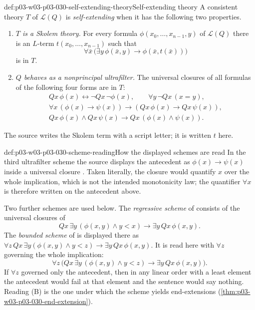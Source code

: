 \begin{hbdefinition}{def:p03-w03-p03-030-self-extending-theory}{Self-extending theory}
A consistent theory \(T\) of \(\mathscr L(Q)\) is \emph{self-extending}
\cite[Definition~6.1.1, pp.~202--203]{Schmerl1985TransferTheorems} when it
has the following two properties.
\begin{enumerate}
\item \emph{\(T\) is a Skolem theory.}  For every formula
  \(\phi(x_0,\ldots,x_{n-1},y)\) of \(\mathscr L(Q)\) there is an
  \(L\)-term \(t(x_0,\ldots,x_{n-1})\) such that
  \[
   \forall\bar x\,\bigl(\exists y\,\phi(\bar x,y)\rightarrow
                         \phi(\bar x,t(\bar x))\bigr)
  \]
  is in \(T\).
\item \emph{\(Q\) behaves as a nonprincipal ultrafilter.}  The universal
  closures of all formulas of the following four forms are in \(T\):
  \begin{gather*}
   Qx\,\phi(x)\leftrightarrow\neg Qx\,\neg\phi(x),\qquad
   \forall y\,\neg Qx\,(x=y),\\
   \forall x\,(\phi(x)\rightarrow\psi(x))\rightarrow
     (Qx\,\phi(x)\rightarrow Qx\,\psi(x)),\\
   Qx\,\phi(x)\wedge Qx\,\psi(x)\rightarrow Qx\,(\phi(x)\wedge\psi(x)).
  \end{gather*}
\end{enumerate}
The source writes the Skolem term with a script letter; it is written
\(t\) here.
\end{hbdefinition}

\begin{hbconvention}{def:p03-w03-p03-030-scheme-reading}{How the displayed schemes are read}
In the third ultrafilter scheme the source displays the antecedent as
\(\phi(x)\rightarrow\psi(x)\) inside a universal closure
\cite[p.~203]{Schmerl1985TransferTheorems}.  Taken literally, the closure
would quantify \(x\) over the whole implication, which is not the intended
monotonicity law; the quantifier \(\forall x\) is therefore written on the
antecedent above.

Two further schemes are used below.  The \emph{regressive scheme} of
\cite[Theorem~6.1.6, p.~204]{Schmerl1985TransferTheorems} consists of the
universal closures of
\[
 Qx\,\exists y\,(\phi(x,y)\wedge y<x)\rightarrow\exists y\,Qx\,\phi(x,y).
 \tag{R}
\]
The \emph{bounded scheme} of
\cite[Theorems~6.1.3 and 6.2.2, pp.~204 and 206]{Schmerl1985TransferTheorems}
is displayed there as
\(\forall z\,Qx\,\exists y(\phi(x,y)\wedge y<z)\rightarrow\exists y\,Qx\,\phi(x,y)\).
It is read here with \(\forall z\) governing the whole implication:
\[
 \forall z\,\bigl(Qx\,\exists y\,(\phi(x,y)\wedge y<z)\rightarrow
                  \exists y\,Qx\,\phi(x,y)\bigr).
 \tag{B}
\]
If \(\forall z\) governed only the antecedent, then in any linear order with a
least element the antecedent would fail at that element and the sentence
would say nothing.  Reading (B) is the one under which the scheme yields
end-extensions (\cref{thm:p03-w03-p03-030-end-extension}).
\end{hbconvention}

